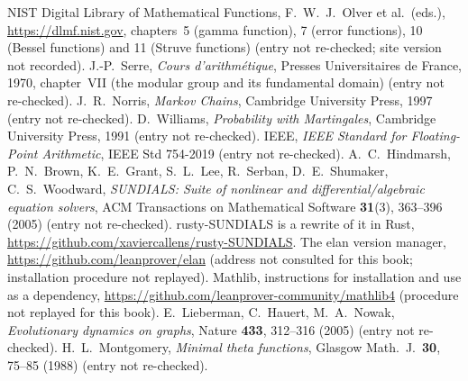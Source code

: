  NIST Digital Library of Mathematical Functions, F.~W.~J.~Olver et al.\ (eds.),
\url{https://dlmf.nist.gov}, chapters~5 (gamma function), 7 (error functions), 10 (Bessel functions) and 11
(Struve functions) (entry not re-checked; site version not recorded).
 J.-P.~Serre, \emph{Cours d'arithmétique}, Presses Universitaires de France, 1970, chapter~VII
(the modular group and its fundamental domain) (entry not re-checked).
 J.~R.~Norris, \emph{Markov Chains}, Cambridge University Press, 1997 (entry not re-checked).
 D.~Williams, \emph{Probability with Martingales}, Cambridge University Press, 1991 (entry not
re-checked).
 IEEE, \emph{IEEE Standard for Floating-Point Arithmetic}, IEEE Std 754-2019 (entry not
re-checked).
 A.~C.~Hindmarsh, P.~N.~Brown, K.~E.~Grant, S.~L.~Lee, R.~Serban, D.~E.~Shumaker,
C.~S.~Woodward, \emph{SUNDIALS: Suite of nonlinear and differential/algebraic equation solvers}, ACM Transactions on
Mathematical Software \textbf{31}(3), 363--396 (2005) (entry not re-checked). rusty-SUNDIALS is a rewrite of it in
Rust, \url{https://github.com/xaviercallens/rusty-SUNDIALS}.
 The elan version manager, \url{https://github.com/leanprover/elan} (address not consulted
for this book; installation procedure not replayed).
 Mathlib, instructions for installation and use as a dependency,
\url{https://github.com/leanprover-community/mathlib4} (procedure not replayed for this book).
 E.~Lieberman, C.~Hauert, M.~A.~Nowak, \emph{Evolutionary dynamics on graphs}, Nature
\textbf{433}, 312--316 (2005) (entry not re-checked).
 H.~L.~Montgomery, \emph{Minimal theta functions}, Glasgow Math.\ J.\ \textbf{30},
75--85 (1988) (entry not re-checked).
